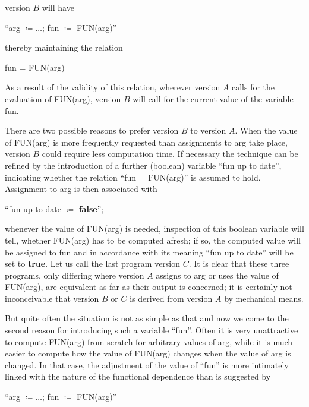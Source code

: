 \noindent
version $B$ will have
\medskip

{
	\setlength{\parindent}{8em}
	\hspace{-.4em}``arg $\coloneq \dots$; fun $\coloneq$ FUN(arg)''
	
}
\medskip

\noindent
thereby maintaining the relation
\medskip

{
	\setlength{\parindent}{8em}
	fun = FUN(arg)
}
\medskip

\noindent
As a result of the validity of this relation, wherever version $A$ calls for the evaluation of FUN(arg), version $B$ will call for the current value of the variable fun.

There are two possible reasons to prefer version $B$ to version $A$. When the value of FUN(arg) is more frequently requested than assignments to arg take place, version $B$ could require less computation time. If necessary the technique can be refined by the introduction of a further (boolean) variable ``fun up to date'', indicating whether the relation ``fun = FUN(arg)'' is assumed to hold. Assignment to arg is then associated with
\medskip

{
	\setlength{\parindent}{8em}
	\hspace{-.4em}``fun up to date $\coloneq$ \textbf{false}'';
}
\medskip

\noindent
whenever the value of FUN(arg) is needed, inspection of this boolean variable will tell, whether FUN(arg) has to be computed afresh; if so, the computed value will be assigned to fun and in accordance with its meaning ``fun up to date'' will be set to \textbf{true}. Let us call the last program version $C$. It is clear that these three programs, only differing where version $A$ assigns to arg or uses the value of FUN(arg), are equivalent as far as their output is concerned; it is certainly not inconceivable that version $B$ or $C$ is derived from version $A$ by mechanical means.

But quite often the situation is not as simple as that and now we come to the second reason for introducing such a variable ``fun''. Often it is very unattractive to compute FUN(arg) from scratch for arbitrary values of arg, while it is much easier to compute how the value of FUN(arg) changes when the value of arg is changed. In that case, the adjustment of the value of ``fun'' is more intimately linked with the nature of the functional dependence than is suggested by
\medskip

{
	\setlength{\parindent}{8em}
	\hspace{-.4em}``arg $\coloneq\dots$; fun $\coloneq$ FUN(arg)''
}
\medskip


